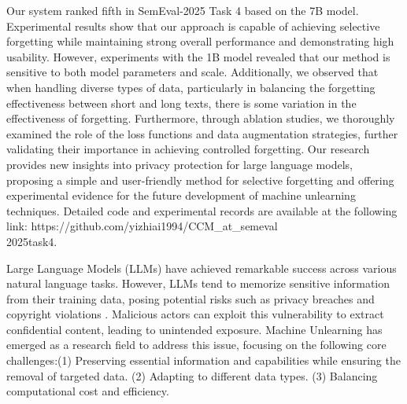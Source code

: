 \documentclass[11pt]{article}
\begin{document}
Our system ranked fifth in SemEval-2025 Task 4 based on the 7B model. 
Experimental results show that our approach is capable of achieving selective forgetting while maintaining strong overall performance and demonstrating high usability. 
However, experiments with the 1B model revealed that our method is sensitive to both model parameters and scale. 
Additionally, we observed that when handling diverse types of data, particularly in balancing the forgetting effectiveness between short and long texts, there is some variation in the effectiveness of forgetting.
Furthermore, through ablation studies, we thoroughly examined the role of the loss functions and data augmentation strategies, further validating their importance in achieving controlled forgetting. 
Our research provides new insights into privacy protection for large language models, proposing a simple and user-friendly method for selective forgetting and offering experimental evidence for the future development of machine unlearning techniques. 
Detailed code and experimental records are available at the following link: https://github.com/yizhiai1994/CCM\_at\_semeval\\2025task4.

\fi


Large Language Models (LLMs) have achieved remarkable success across various natural language tasks. However, LLMs tend to memorize sensitive information from their training data, posing potential risks such as privacy breaches and copyright violations \cite{wang2024machine}. Malicious actors can exploit this vulnerability to extract confidential content, leading to unintended exposure. Machine Unlearning has emerged as a research field to address this issue, focusing on the following core challenges\cite{qu2023learn, li2025machine}:(1) Preserving essential information and capabilities while ensuring the removal of targeted data. (2) Adapting to different data types. (3) Balancing computational cost and efficiency.
\end{document}
